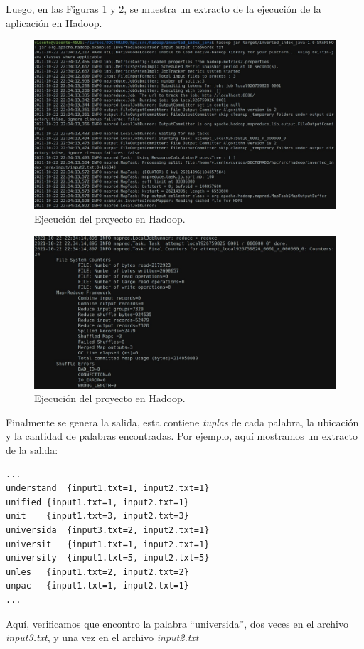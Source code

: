 \documentclass{article}
\begin{document}
\vspace{0.25cm}

Luego, en las Figuras \ref{fig:hadoop} y \ref{fig:hadoop2}, se muestra un extracto de la ejecución de la aplicación en Hadoop. 

\begin{figure}[H]
    \centering
    \includegraphics[width=15cm]{tareas/img/hadoop.jpg}
    \caption{Ejecución del proyecto en Hadoop.}
    \label{fig:hadoop}
\end{figure}

\begin{figure}[H]
    \centering
    \includegraphics[width=15cm]{tareas/img/hadoop2.jpg}
    \caption{Ejecución del proyecto en Hadoop.}
    \label{fig:hadoop2}
\end{figure}


Finalmente se genera la salida, esta contiene \textit{tuplas} de cada palabra, la ubicación y la cantidad de palabras encontradas. Por ejemplo, aquí mostramos un extracto de la salida:

\begin{lstlisting}
...
understand	{input1.txt=1, input2.txt=1}
unified	{input1.txt=1, input2.txt=1}
unit	{input1.txt=3, input2.txt=3}
universida	{input3.txt=2, input2.txt=1}
universit	{input1.txt=1, input2.txt=1}
university	{input1.txt=5, input2.txt=5}
unles	{input1.txt=2, input2.txt=2}
unpac	{input1.txt=1, input2.txt=1}
...
\end{lstlisting}

Aquí, verificamos que encontro la palabra ``universida'', dos veces en el archivo \textit{input3.txt}, y una vez en el archivo \textit{input2.txt}




%


	
	
	
	
\end{document}
